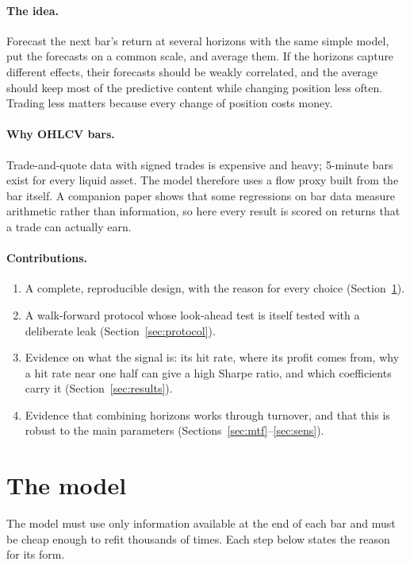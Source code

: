 \documentclass[11pt,a4paper]{article}
\begin{document}
\paragraph{The idea.} Forecast the next bar's return at several horizons with the same simple model, put
the forecasts on a common scale, and average them. If the horizons capture different effects, their
forecasts should be weakly correlated, and the average should keep most of the predictive content while
changing position less often. Trading less matters because every change of position costs money.

\paragraph{Why OHLCV bars.} Trade-and-quote data with signed trades is expensive and heavy; 5-minute bars
exist for every liquid asset. The model therefore uses a flow proxy built from the bar itself. A
companion paper shows that some regressions on bar data measure arithmetic rather than information, so
here every result is scored on returns that a trade can actually earn.

\paragraph{Contributions.}
\begin{enumerate}
\item A complete, reproducible design, with the reason for every choice (Section~\ref{sec:model}).
\item A walk-forward protocol whose look-ahead test is itself tested with a deliberate leak
(Section~\ref{sec:protocol}).
\item Evidence on what the signal is: its hit rate, where its profit comes from, why a hit rate near one
half can give a high Sharpe ratio, and which coefficients carry it (Section~\ref{sec:results}).
\item Evidence that combining horizons works through turnover, and that this is robust to the main
parameters (Sections~\ref{sec:mtf}--\ref{sec:sens}).
\end{enumerate}

\section{The model}
\label{sec:model}

The model must use only information available at the end of each bar and must be cheap enough to refit thousands of times. Each step below states the reason for its form.
\end{document}
